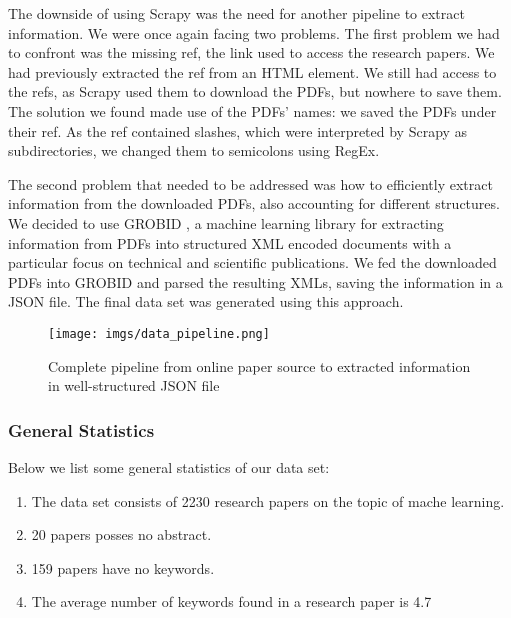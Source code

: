 The downside of using Scrapy \cite{kouzis2016learning} was the need for another pipeline to extract information. We were once again facing two problems. The first problem we had to confront was the missing ref, the link used to access the research papers. We had previously extracted the ref from an HTML element. We still had access to the refs, as Scrapy  \cite{kouzis2016learning}used them to download the PDFs, but nowhere to save them. The solution we found made use of the PDFs' names: we saved the PDFs under their ref. As the ref contained slashes, which were interpreted by Scrapy \cite{kouzis2016learning} as subdirectories, we changed them to semicolons using RegEx.


The second problem that needed to be addressed was how to efficiently extract information from the downloaded PDFs, also accounting for different structures. We decided to use GROBID \cite{GROBID}, a machine learning library for extracting information from PDFs into structured XML encoded documents with a particular focus on technical and scientific publications. We fed the downloaded PDFs into GROBID  \cite{GROBID} and parsed the resulting XMLs, saving the information in a JSON file. The final data set was generated using this approach.


\begin{figure}[h]
    \centering
    \texttt{[image: imgs/data\_pipeline.png]}
    \caption{Complete pipeline from online paper source to extracted information in well-structured JSON file}
    \label{fig:data pipeline}
\end{figure}

\subsubsection{General Statistics}
\subsubcomment{}
Below we list some general statistics of our data set:
\begin{enumerate}
	\item The data set consists of 2230 research papers on the topic of mache learning.
	\item 20 papers posses no abstract.
	\item 159 papers have no keywords.
	\item The average number of keywords found in a research paper is 4.7
\end{enumerate}
